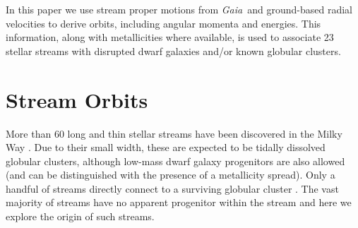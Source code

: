 \documentclass[twocolumn]{aastex63}
\newcommand{\gaia}{\textsl{Gaia}}
\begin{document}
In this paper we use stream proper motions from \gaia\ and ground-based radial velocities to derive orbits, including angular momenta and energies.
This information, along with metallicities where available, is used to associate 23 stellar streams with disrupted dwarf galaxies and/or known globular clusters.



\section{Stream Orbits}
\label{sec:streamorbits}
More than 60 long and thin stellar streams have been discovered in the Milky Way \citep[see][for an up-to-date catalog]{mateu2018}.
Due to their small width, these are expected to be tidally dissolved globular clusters, although low-mass dwarf galaxy progenitors are also allowed (and can be distinguished with the presence of a metallicity spread).
Only a handful of streams directly connect to a surviving globular cluster \citep[e.g.,][]{rockosi2002, grillmair2006b}.
The vast majority of streams have no apparent progenitor within the stream and here we explore the origin of such streams.
\end{document}
